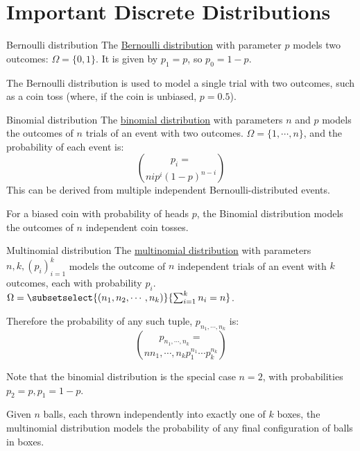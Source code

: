 \documentclass[../Main.tex]{subfiles}
\begin{document}
\section{Important Discrete Distributions}
\begin{definition}{Bernoulli distribution}
    The \underline{Bernoulli distribution} with parameter $p$ models two outcomes: $\Omega = \{0, 1\}$. It is given by $p_1 = p$, so $p_0 = 1-p$.
\end{definition}
The Bernoulli distribution is used to model a single trial with two outcomes, such as a coin toss (where, if the coin is unbiased, $p = 0.5$).
\begin{definition}{Binomial distribution}
    The \underline{binomial distribution} with parameters $n$ and $p$ models the outcomes of $n$ trials of an event with two outcomes. $\Omega = \{1, \cdots, n\}$, and the probability of each event is:
    \begin{equation*}
        p_i = \choose{n}{i}p^i(1-p)^{n-i}
    \end{equation*}
    This can be derived from multiple independent Bernoulli-distributed events.
\end{definition}
\begin{example}
    For a biased coin with probability of heads $p$, the Binomial distribution models the outcomes of $n$ independent coin tosses.
\end{example}
\begin{definition}{Multinomial distribution}
    The \underline{multinomial distribution} with parameters $n, k, (p_i)_{i=1}^k$ models the outcome of $n$ independent trials of an event with $k$ outcomes, each with probability $p_i$. $\Omega = \subsetselect{(n_1, n_2, \cdots, n_k)}{\sum_{i=1}^k n_i = n}$.\par
    Therefore the probability of any such tuple, $p_{n_1, \cdots, n_k}$ is:
    \begin{equation*}
        p_{n_1, \cdots, n_k} = \choose{n}{n_1, \cdots, n_k} p_1^{n_1} \cdots p_k^{n_k}
    \end{equation*}
\end{definition}
Note that the binomial distribution is the special case $n = 2$, with probabilities $p_2 = p, p_1 = 1-p$.
\begin{example}
    Given $n$ balls, each thrown independently into exactly one of $k$ boxes, the multinomial distribution models the probability of any final configuration of balls in boxes.
\end{example}
\end{document}

